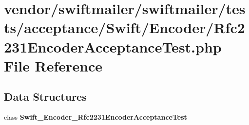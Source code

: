 \section{vendor/swiftmailer/swiftmailer/tests/acceptance/\+Swift/\+Encoder/\+Rfc2231\+Encoder\+Acceptance\+Test.php File Reference}
\label{_rfc2231_encoder_acceptance_test_8php}
\subsection*{Data Structures}
\begin{DoxyCompactItemize}
\item 
class {\bf Swift\+\_\+\+Encoder\+\_\+\+Rfc2231\+Encoder\+Acceptance\+Test}
\end{DoxyCompactItemize}
